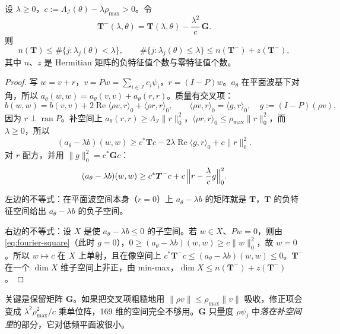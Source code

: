 \documentclass[11pt,a4paper,fontset=fandol]{ctexart}
\begin{document}
\begin{theorem}
\label{thm:fourier-count}
设 $\lambda\ge0$，$c:=\Lambda_{\mathcal I}(\theta)-\lambda\rho_{\max}>0$。令
\begin{equation}
\label{eq:Tminus}
\bm T^-(\lambda,\theta)=\bm T(\lambda,\theta)-\frac{\lambda^2}{c}\,\bm G .
\end{equation}
则
\begin{equation}
\label{eq:fourier-count}
n(\bm T)\le\#\{j:\lambda_j(\theta)<\lambda\},\qquad
\#\{j:\lambda_j(\theta)\le\lambda\}\le n(\bm T^-)+z(\bm T^-),
\end{equation}
其中 $n$、$z$ 是 Hermitian 矩阵的负特征值个数与零特征值个数。
\end{theorem}

\begin{proof}
写 $w=v+r$，$v=Pw=\sum_{i\in\mathcal I}c_i\psi_i$，$r=(I-P)w$。$a_\theta$ 在平面波基下对角，所以 $a_\theta(w,w)=a_\theta(v,v)+a_\theta(r,r)$。质量有交叉项：
\[
b(w,w)=b(v,v)+2\operatorname{Re}\langle\rho v,r\rangle_0+\langle\rho r,r\rangle_0,\qquad
\langle\rho v,r\rangle_0=\langle g,r\rangle_0,\quad g:=(I-P)(\rho v),
\]
因为 $r\perp\operatorname{ran}P$。补空间上 $a_\theta(r,r)\ge\Lambda_{\mathcal I}\|r\|_0^2$，$\langle\rho r,r\rangle_0\le\rho_{\max}\|r\|_0^2$，而 $\lambda\ge0$，所以
\[
(a_\theta-\lambda b)(w,w)\ge c^*\bm Tc-2\lambda\operatorname{Re}\langle g,r\rangle_0+c\|r\|_0^2 .
\]
对 $r$ 配方，并用 $\|g\|_0^2=c^*\bm Gc$：
\begin{equation}
\label{eq:fourier-square}
(a_\theta-\lambda b)(w,w)\ge c^*\bm T^-c+c\,\Bigl\|r-\frac{\lambda}{c}g\Bigr\|_0^2 .
\end{equation}

左边的不等式：在平面波空间本身（$r=0$）上 $a_\theta-\lambda b$ 的矩阵就是 $\bm T$，$\bm T$ 的负特征空间给出 $a_\theta-\lambda b$ 的负子空间。

右边的不等式：设 $X$ 是使 $a_\theta-\lambda b\le0$ 的子空间。若 $w\in X$、$Pw=0$，则由 \eqref{eq:fourier-square}（此时 $g=0$），$0\ge(a_\theta-\lambda b)(w,w)\ge c\|w\|_0^2$，故 $w=0$。所以 $w\mapsto c$ 在 $X$ 上单射，且在像空间上 $c^*\bm T^-c\le(a_\theta-\lambda b)(w,w)\le0$。$\bm T^-$ 在一个 $\dim X$ 维子空间上非正，由 min-max，$\dim X\le n(\bm T^-)+z(\bm T^-)$。
\end{proof}

\begin{remark}
关键是保留矩阵 $\bm G$。如果把交叉项粗糙地用 $\|\rho v\|\le\rho_{\max}\|v\|$ 吸收，修正项会变成 $\lambda^2\rho_{\max}^2/c$ 乘单位阵，169 维的空间完全不够用。$\bm G$ 只量度 $\rho\psi_j$ 中\emph{落在补空间里}的部分，它对低频平面波很小。
\end{remark}
\end{document}

